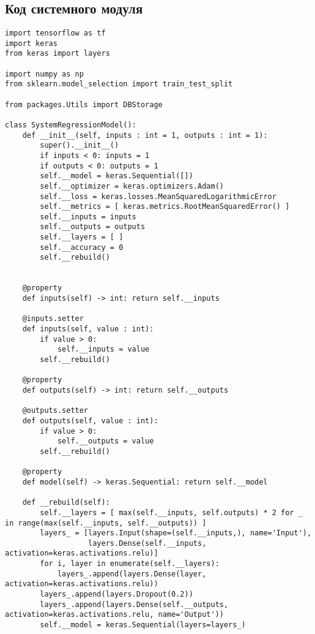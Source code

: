 \chapter{}

\section*{Код системного модуля}


\begin{lstlisting}
import tensorflow as tf
import keras
from keras import layers

import numpy as np
from sklearn.model_selection import train_test_split

from packages.Utils import DBStorage

class SystemRegressionModel():
    def __init__(self, inputs : int = 1, outputs : int = 1):
        super().__init__()
        if inputs < 0: inputs = 1
        if outputs < 0: outputs = 1
        self.__model = keras.Sequential([])
        self.__optimizer = keras.optimizers.Adam()
        self.__loss = keras.losses.MeanSquaredLogarithmicError
        self.__metrics = [ keras.metrics.RootMeanSquaredError() ]
        self.__inputs = inputs
        self.__outputs = outputs
        self.__layers = [ ]
        self.__accuracy = 0
        self.__rebuild()


    @property
    def inputs(self) -> int: return self.__inputs
    
    @inputs.setter
    def inputs(self, value : int): 
        if value > 0: 
            self.__inputs = value
        self.__rebuild()
    
    @property
    def outputs(self) -> int: return self.__outputs
    
    @outputs.setter
    def outputs(self, value : int): 
        if value > 0: 
            self.__outputs = value
        self.__rebuild()
    
    @property
    def model(self) -> keras.Sequential: return self.__model
    
    def __rebuild(self):
        self.__layers = [ max(self.__inputs, self.outputs) * 2 for _ in range(max(self.__inputs, self.__outputs)) ]
        layers_ = [layers.Input(shape=(self.__inputs,), name='Input'), 
                   layers.Dense(self.__inputs, activation=keras.activations.relu)]
        for i, layer in enumerate(self.__layers):
            layers_.append(layers.Dense(layer, activation=keras.activations.relu))
        layers_.append(layers.Dropout(0.2))
        layers_.append(layers.Dense(self.__outputs, activation=keras.activations.relu, name='Output'))
        self.__model = keras.Sequential(layers=layers_)
        

\end{lstlisting}
